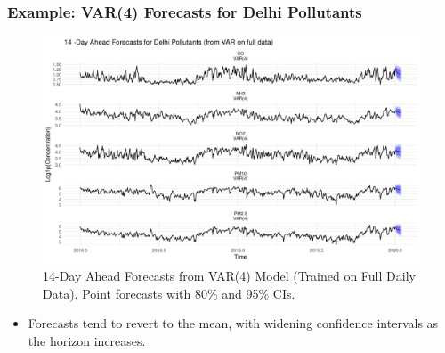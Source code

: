 \documentclass[svgnames, 12pt]{beamer}
\begin{document}
\begin{frame}
    \frametitle{Example: VAR(4) Forecasts for Delhi Pollutants}
    \begin{figure}
        \includegraphics[width=\linewidth]{../analysis/assets/var_forecast_delhi.png}
        \caption{14-Day Ahead Forecasts from VAR(4) Model (Trained on Full Daily Data). Point forecasts with 80\% and 95\% CIs.}
        \label{fig:var_forecast_delhi_pres}
    \end{figure}
    \begin{itemize}
        \item \footnotesize Forecasts tend to revert to the mean, with widening confidence intervals as the horizon increases.
    \end{itemize}
\end{frame}

\end{document}

